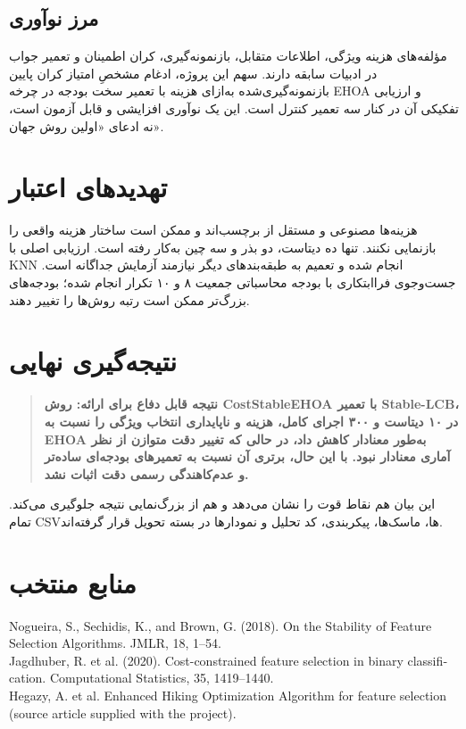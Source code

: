 \documentclass[12pt,a4paper]{article}
\newcommand{\lr}[1]{\foreignlanguage{english}{#1}}
\newenvironment{latin}{\begin{otherlanguage}{english}}{\end{otherlanguage}}
\newenvironment{resultbox}{\begin{quote}\color{navy}\bfseries}{\end{quote}}
\begin{document}
\subsection{مرز نوآوری}
مؤلفه‌های هزینه ویژگی، اطلاعات متقابل، بازنمونه‌گیری، کران اطمینان و تعمیر جواب در ادبیات سابقه دارند. سهم این پروژه، ادغام مشخصِ امتیاز کران پایین بازنمونه‌گیری‌شده به‌ازای هزینه با تعمیر سخت بودجه در چرخه EHOA و ارزیابی تفکیکی آن در کنار سه تعمیر کنترل است. این یک نوآوری افزایشی و قابل آزمون است، نه ادعای «اولین روش جهان».

\section{تهدیدهای اعتبار}
هزینه‌ها مصنوعی و مستقل از برچسب‌اند و ممکن است ساختار هزینه واقعی را بازنمایی نکنند. تنها ده دیتاست، دو بذر و سه چین به‌کار رفته است. ارزیابی اصلی با KNN انجام شده و تعمیم به طبقه‌بندهای دیگر نیازمند آزمایش جداگانه است. جست‌وجوی فراابتکاری با بودجه محاسباتی جمعیت ۸ و ۱۰ تکرار انجام شده؛ بودجه‌های بزرگ‌تر ممکن است رتبه روش‌ها را تغییر دهند.

\section{نتیجه‌گیری نهایی}
\begin{resultbox}
نتیجه قابل دفاع برای ارائه: روش \lr{CostStableEHOA} با تعمیر \lr{Stable-LCB}، در ۱۰ دیتاست و ۳۰۰ اجرای کامل، هزینه و ناپایداری انتخاب ویژگی را نسبت به EHOA به‌طور معنادار کاهش داد، در حالی که تغییر دقت متوازن از نظر آماری معنادار نبود. با این حال، برتری آن نسبت به تعمیرهای بودجه‌ای ساده‌تر و عدم‌کاهندگی رسمی دقت اثبات نشد.
\end{resultbox}
این بیان هم نقاط قوت را نشان می‌دهد و هم از بزرگ‌نمایی نتیجه جلوگیری می‌کند. تمام CSVها، ماسک‌ها، پیکربندی، کد تحلیل و نمودارها در بسته تحویل قرار گرفته‌اند.

\section*{منابع منتخب}
\begin{latin}\small
Nogueira, S., Sechidis, K., and Brown, G. (2018). On the Stability of Feature Selection Algorithms. JMLR, 18, 1--54.\\
Jagdhuber, R. et al. (2020). Cost-constrained feature selection in binary classification. Computational Statistics, 35, 1419--1440.\\
Hegazy, A. et al. Enhanced Hiking Optimization Algorithm for feature selection (source article supplied with the project).
\end{latin}
\end{document}
